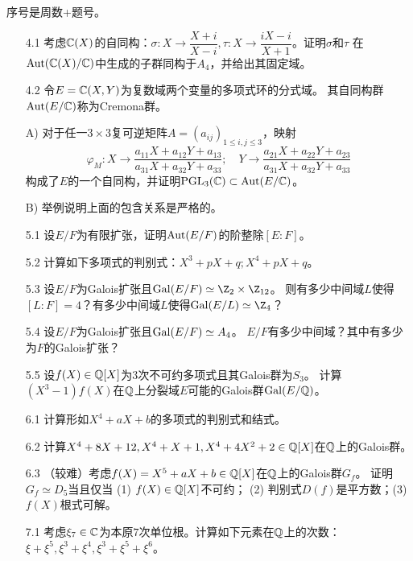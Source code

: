 \qquad\quad 序号是周数+题号。
\begin{itemize}
    \item[4.1] 考虑$\mathbb{C}(X)$的自同构：$\sigma\colon X\to\dfrac{X+i}{X-i},
    \tau\colon X\to\dfrac{iX-i}{X+1}$。证明$\sigma$和$\tau$
    在$\operatorname{Aut}(\mathbb{C}(X)/\mathbb{C})$中生成的子群同构于$A_4$，并给出其固定域。

    \item[4.2] 令$E=\mathbb{C}(X,Y)$为复数域两个变量的多项式环的分式域。
    其自同构群$\operatorname{Aut}(E/\mathbb{C})$称为Cremona群。

    A) 对于任一$3\times3$复可逆矩阵$A=(a_{ij})_{1\le i,j \le3}$，映射
    \[\varphi_M\colon X\to\dfrac{a_{11}X+a_{12}Y+a_{13}}{a_{31}X+a_{32}Y+a_{33}};
    \quad Y\to\frac{a_{21}X+a_{22}Y+a_{23}}{a_{31}X+a_{32}Y+a_{33}}\]
    构成了$E$的一个自同构，并证明$\mathrm{PGL}_3(\mathbb{C})\subset\operatorname{Aut}(E/\mathbb{C})$。

    B) 举例说明上面的包含关系是严格的。

    \item[5.1] 设$E/F$为有限扩张，证明$\operatorname{Aut}(E/F)$的阶整除$[E:F]$。

    \item[5.2] 计算如下多项式的判别式：$X^3+pX+q; X^4+pX+q$。

    \item[5.3] 设$E/F$为Galois扩张且$\Gal(E/F)\simeq\Z_2\times\Z_{12}$。
    则有多少中间域$L$使得$[L:F]=4$？有多少中间域$L$使得$\Gal(E/L)\simeq\Z_4$？

    \item[5.4] 设$E/F$为Galois扩张且$\operatorname{Gal}(E/F)\simeq A_4$。
    $E/F$有多少中间域？其中有多少为$F$的Galois扩张？

    \item[5.5] 设$f(X)\in\mathbb{Q}[X]$为$3$次不可约多项式且其Galois群为$S_3$。
    计算$(X^3-1)f(X)$在$\mathbb{Q}$上分裂域$E$可能的Galois群$\operatorname{Gal}(E/\mathbb{Q})$。

    \item[6.1] 计算形如$X^4+aX+b$的多项式的判别式和结式。

    \item[6.2] 计算$X^4+8X+12,X^4+X+1,X^4+4X^2+2\in\mathbb{Q}[X]$在$\mathbb{Q}$上的Galois群。

    \item[6.3] （较难）考虑$f(X)=X^5+aX+b\in\mathbb{Q}[X]$在$\mathbb{Q}$上的Galois群$G_f$。
    证明$G_f\simeq D_5$当且仅当 (1) $f(X)\in\mathbb{Q}[X]$不可约；
    (2) 判别式$D(f)$是平方数；(3) $f(X)$根式可解。

    \item[7.1] 考虑$\xi_7\in\mathbb{C}$为本原$7$次单位根。计算如下元素在$\mathbb{Q}$上的次数：
    $\xi+\xi^5,\xi^3+\xi^4,\xi^3+\xi^5+\xi^6$。


\end{itemize}

